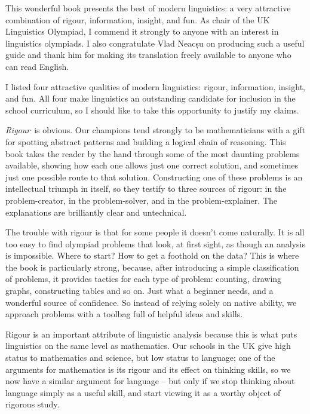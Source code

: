 
This wonderful book presents the best of modern linguistics: a very attractive combination of rigour, information, insight, and fun. As chair of the UK Linguistics Olympiad, I commend it strongly to anyone with an interest in linguistics olympiads. I also congratulate Vlad Neacșu on producing such a useful guide and thank him for making its translation freely available to anyone who can read English.

I listed four attractive qualities of modern linguistics: rigour, information, insight, and fun. All four make linguistics an outstanding candidate for inclusion in the school curriculum, so I should like to take this opportunity to justify my claims.

\textit{Rigour}\ is obvious. Our champions tend strongly to be mathematicians with a gift for spotting abstract patterns and building a logical chain of reasoning. This book takes the reader by the hand through some of the most daunting problems available, showing how each one allows just one correct solution, and sometimes just one possible route to that solution. Constructing one of these problems is an intellectual triumph in itself, so they testify to three sources of rigour: in the problem-creator, in the problem-solver, and in the problem-explainer. The explanations are brilliantly clear and untechnical.
 
The trouble with rigour is that for some people it doesn't come naturally. It is all too easy to find olympiad problems that look, at first sight, as though an analysis is impossible. Where to start? How to get a foothold on the data? This is where the book is particularly strong, because, after introducing a simple classification of problems, it provides tactics for each type of problem: counting, drawing graphs, constructing tables and so on. Just what a beginner needs, and a wonderful source of confidence. So instead of relying solely on native ability, we approach problems with a toolbag full of helpful ideas and skills.
 
Rigour is an important attribute of linguistic analysis because this is what puts linguistics on the same level as mathematics. Our schools in the UK give high status to mathematics and science, but low status to language; one of the arguments for mathematics is its rigour and its effect on thinking skills, so we now have a similar argument for language – but only if we stop thinking about language simply as a useful skill, and start viewing it as a worthy object of rigorous study.
 

